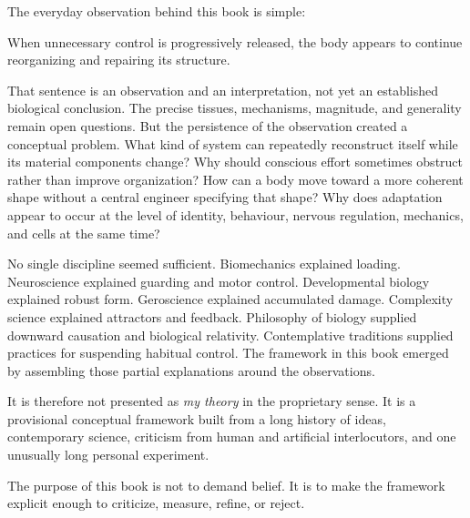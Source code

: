 The everyday observation behind this book is simple:

\begin{principlebox}
When unnecessary control is progressively released, the body appears to continue reorganizing and repairing its structure.
\end{principlebox}

That sentence is an observation and an interpretation, not yet an established biological conclusion. The precise tissues, mechanisms, magnitude, and generality remain open questions. But the persistence of the observation created a conceptual problem. What kind of system can repeatedly reconstruct itself while its material components change? Why should conscious effort sometimes obstruct rather than improve organization? How can a body move toward a more coherent shape without a central engineer specifying that shape? Why does adaptation appear to occur at the level of identity, behaviour, nervous regulation, mechanics, and cells at the same time?

No single discipline seemed sufficient. Biomechanics explained loading. Neuroscience explained guarding and motor control. Developmental biology explained robust form. Geroscience explained accumulated damage. Complexity science explained attractors and feedback. Philosophy of biology supplied downward causation and biological relativity. Contemplative traditions supplied practices for suspending habitual control. The framework in this book emerged by assembling those partial explanations around the observations.

It is therefore not presented as \emph{my theory} in the proprietary sense. It is a provisional conceptual framework built from a long history of ideas, contemporary science, criticism from human and artificial interlocutors, and one unusually long personal experiment.

The purpose of this book is not to demand belief. It is to make the framework explicit enough to criticize, measure, refine, or reject.
\cleardoublepage

